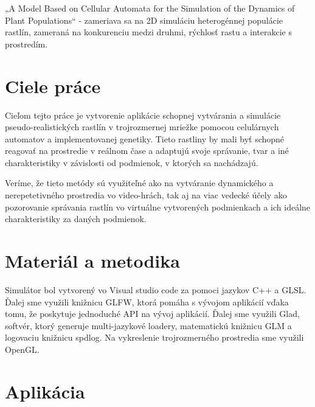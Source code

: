 \documentclass[12pt]{article}
\begin{document}
„A Model Based on Cellular Automata for the Simulation of the Dynamics of
Plant Populations“ - zameriava sa na 2D simuláciu heterogénnej populácie
rastlín, zameraná na konkurenciu medzi druhmi, rýchlosť rastu a interakcie
s prostredím.

\section{Ciele práce}

Cieľom tejto práce je vytvorenie aplikácie schopnej vytvárania a simulácie
pseudo-rea\-listických rastlín v trojrozmernej mriežke pomocou celulárnych
automatov a implementovanej genetiky.
Tieto rastliny by mali byť schopné reagovať na prostredie v reálnom čase
a adaptujú svoje správanie, tvar a iné charakteristiky v závislosti
od podmienok, v ktorých sa nachádzajú.

Veríme, že tieto metódy sú využiteľné ako na vytváranie dynamického
a nerepetetivného prostredia vo video-hrách, tak aj na viac vedecké účely
ako pozorovanie správania rastlín vo virtuálne vytvorených podmienkach
a ich ideálne charakteristiky za daných podmienok.

\section{Materiál a metodika}

Simulátor %
bol vytvorený vo Visual studio code za pomoci jazykov C++ a GLSL.
Ďalej sme využili knižnicu GLFW, ktorá pomáha s vývojom aplikácií vďaka tomu,
že poskytuje jednoduché API na vývoj aplikácií. Ďalej sme využili Glad,
softvér, ktorý generuje multi-jazykové loadery, matematickú knižnicu GLM
a logovaciu knižnicu spdlog. Na vykreslenie trojrozmerného prostredia sme
využili OpenGL.

\section{Aplikácia}
\end{document}
